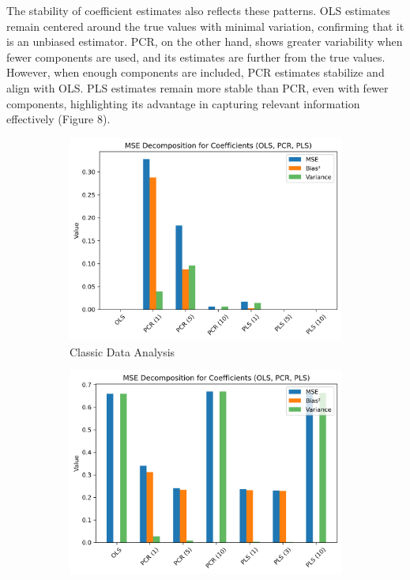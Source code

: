 \documentclass[11pt,twoside,a4paper]{article}
\begin{document}
The stability of coefficient estimates also reflects these patterns. OLS estimates remain centered around the true values with minimal variation, confirming that it is an unbiased estimator. PCR, on the other hand, shows greater variability when fewer components are used, and its estimates are further from the true values. However, when enough components are included, PCR estimates stabilize and align with OLS. PLS estimates remain more stable than PCR, even with fewer components, highlighting its advantage in capturing relevant information effectively (Figure 8).

\begin{figure}[H]
    \centering
    \begin{subfigure}{0.32\textwidth}
        \centering
        \includegraphics[width=\linewidth]{Fifth_plot.png}
        \caption{Classic Data Analysis}
        \label{fig:Classic_data_analysis}
    \end{subfigure}
    \hfill
    \begin{subfigure}{0.32\textwidth}
        \centering
        \includegraphics[width=\linewidth]{Fifth_plot_second_simulation.png}

\end{subfigure}
\end{figure}
\end{document}
